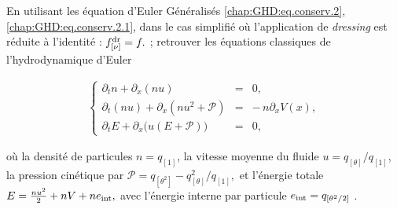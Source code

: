{\begin{enumerate}[label =\textbf{\arabic*.}, ref=\arabic*]
          En utilisant les équation d'Euler Généralisés \eqref{chap:GHD:eq.conserv.2},
          \eqref{chap:GHD:eq.conserv.2.1}, dans le cas simplifié où l’application de
          \textit{dressing} est réduite à l’identité : \( f^{\rm dr}_{[\nu]} = f. \) ;
          retrouver les équations classiques de l’hydrodynamique d’Euler
          \begin{center}
              \begin{minipage}{0.52\linewidth}
                  \begin{eqnarray}\label{chap:3:eq:hydro.1}
                      \left\{
                      \begin{array}{rcl}
                          \partial_t n + \partial_x (n u)                      & = & 0,                    \\
                          \partial_t (n u) + \partial_x (nu^2 + \mathcal{P})   & = & -\, n\partial_x V(x), \\
                          \partial_t E + \partial_x \big(u(E+\mathcal{P})\big) & = & 0,
                      \end{array}
                      \right .
                  \end{eqnarray}
              \end{minipage}
              \hfill
              \begin{minipage}{0.45\linewidth}
                  où la densité de particules $n = q_{[1]}$, la vitesse moyenne du fluide
                  $u = q_{[\theta]}/q_{[1]}$, la pression cinétique par
                  \(
                  \mathcal{P} = q_{[\theta^2]} - {q_{[\theta]}^2}/{q_{[1]}},
                  \)
                  et l’énergie totale
                  \(
                  E = \frac{n u^2}{2} + nV + ne_{\rm int},
                  \)
                  avec l’énergie interne par particule
                  \(
                  e_{\rm int} = q_{[\theta^2/2]}
                  \)
                  .
              \end{minipage}
          \end{center}




\end{enumerate}}
